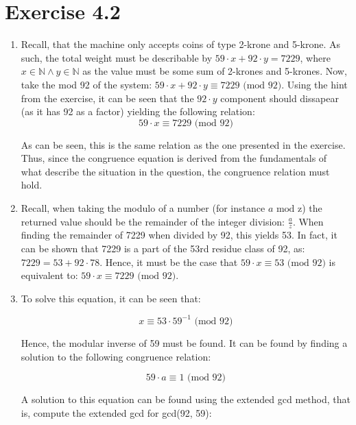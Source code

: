 \pagebreak
\section{Exercise 4.2}
\renewcommand{\labelenumi}{\alph{enumi})}
\begin{enumerate}
\item
Recall, that the machine only accepts coins of type 2-krone and 5-krone. As such, the total weight must be describable by $59 \cdot x + 92 \cdot y = 7229$, where $x \in \mathbb{N} \land y \in \mathbb{N}$ as the value must be some sum of 2-krones and 5-krones. Now, take the mod 92 of the system: $59 \cdot x + 92 \cdot y \equiv 7229 \text{ (mod 92)}$. Using the hint from the exercise, it can be seen that the $92 \cdot y$ component should dissapear (as it has 92 as a factor) yielding the following relation:
\begin{equation}
    59 \cdot x \equiv 7229 \text{ (mod 92)}
\end{equation}

As can be seen, this is the same relation as the one presented in the exercise. Thus, since the congruence equation is derived from the fundamentals of what describe the situation in the question, the congruence relation must hold.

\item
Recall, when taking the modulo of a number (for instance $a \text{ mod z}$) the returned value should be the remainder of the integer division: $\frac{a}{z}$. When finding the remainder of 7229 when divided by 92, this yields 53. In fact, it can be shown that 7229 is a part of the 53rd residue class of 92, as: $7229 = 53 + 92 \cdot 78$. Hence, it must be the case that $59 \cdot x \equiv 53 \text{ (mod 92)}$ is equivalent to: $59 \cdot x \equiv 7229 \text{ (mod 92)}$.

\item
To solve this equation, it can be seen that:

\begin{equation}
    x \equiv 53 \cdot 59^{-1} \text{ (mod 92)}
\end{equation}

Hence, the modular inverse of 59 must be found. It can be found by finding a solution to the following congruence relation:

\begin{equation}
    59 \cdot a \equiv 1 \text{ (mod 92)}
\end{equation}

A solution to this equation can be found using the extended gcd method, that is, compute the extended gcd for gcd(92, 59):


\end{enumerate}
